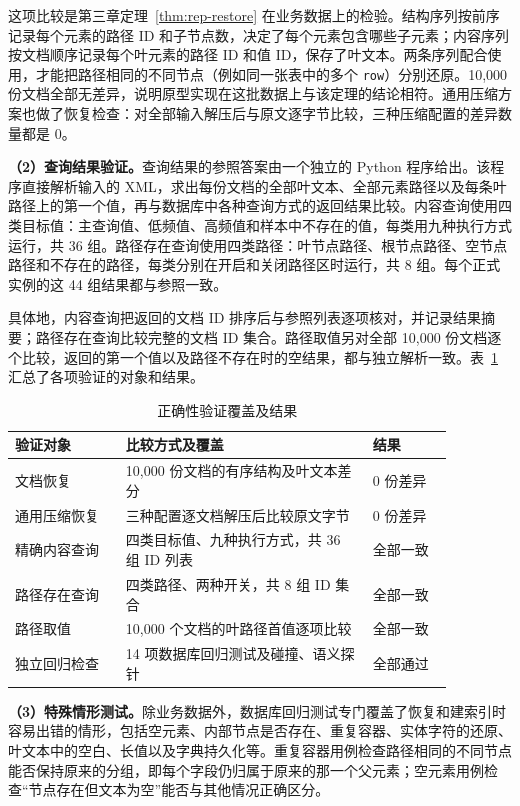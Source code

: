 这项比较是第三章定理~\ref{thm:rep-restore} 在业务数据上的检验。结构序列按前序记录每个元素的路径 ID 和子节点数，决定了每个元素包含哪些子元素；内容序列按文档顺序记录每个叶元素的路径 ID 和值 ID，保存了叶文本。两条序列配合使用，才能把路径相同的不同节点（例如同一张表中的多个 \texttt{row}）分别还原。10,000 份文档全部无差异，说明原型实现在这批数据上与该定理的结论相符。通用压缩方案也做了恢复检查：对全部输入解压后与原文逐字节比较，三种压缩配置的差异数量都是 0。

\textbf{（2）查询结果验证。}查询结果的参照答案由一个独立的 Python 程序给出。该程序直接解析输入的 XML，求出每份文档的全部叶文本、全部元素路径以及每条叶路径上的第一个值，再与数据库中各种查询方式的返回结果比较。内容查询使用四类目标值：主查询值、低频值、高频值和样本中不存在的值，每类用九种执行方式运行，共 36 组。路径存在查询使用四类路径：叶节点路径、根节点路径、空节点路径和不存在的路径，每类分别在开启和关闭路径区时运行，共 8 组。每个正式实例的这 44 组结果都与参照一致。

具体地，内容查询把返回的文档 ID 排序后与参照列表逐项核对，并记录结果摘要；路径存在查询比较完整的文档 ID 集合。路径取值另对全部 10,000 份文档逐个比较，返回的第一个值以及路径不存在时的空结果，都与独立解析一致。表~\ref{tab:exp-correctness} 汇总了各项验证的对象和结果。
\begin{table}[htbp]
\centering\small
\caption{正确性验证覆盖及结果}
\label{tab:exp-correctness}
\begin{tabular}{p{0.22\linewidth}p{0.49\linewidth}p{0.16\linewidth}}
\toprule
验证对象 & 比较方式及覆盖 & 结果 \\
\midrule
文档恢复 & 10,000 份文档的有序结构及叶文本差分 & 0 份差异 \\
通用压缩恢复 & 三种配置逐文档解压后比较原文字节 & 0 份差异 \\
精确内容查询 & 四类目标值、九种执行方式，共 36 组 ID 列表 & 全部一致 \\
路径存在查询 & 四类路径、两种开关，共 8 组 ID 集合 & 全部一致 \\
路径取值 & 10,000 个文档的叶路径首值逐项比较 & 全部一致 \\
独立回归检查 & 14 项数据库回归测试及碰撞、语义探针 & 全部通过 \\
\bottomrule
\end{tabular}
\end{table}

\textbf{（3）特殊情形测试。}除业务数据外，数据库回归测试专门覆盖了恢复和建索引时容易出错的情形，包括空元素、内部节点是否存在、重复容器、实体字符的还原、叶文本中的空白、长值以及字典持久化等。重复容器用例检查路径相同的不同节点能否保持原来的分组，即每个字段仍归属于原来的那一个父元素；空元素用例检查“节点存在但文本为空”能否与其他情况正确区分。


